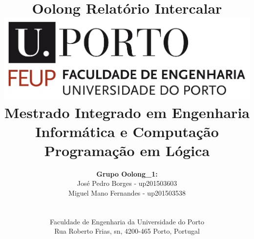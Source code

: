 \documentclass[a4paper]{article}
\begin{document}
\setlength{\textwidth}{16cm}
\setlength{\textheight}{22cm}

\title{\Huge\textbf{Oolong}\linebreak\linebreak\linebreak
\Large\textbf{Relatório Intercalar}\linebreak\linebreak
\linebreak\linebreak
\includegraphics[scale=0.1]{feup-logo.png}\linebreak\linebreak
\linebreak\linebreak
\Large{Mestrado Integrado em Engenharia Informática e Computação} \linebreak\linebreak
\Large{Programação em Lógica}\linebreak
}

\author{\textbf{Grupo Oolong\_1:}\\
José Pedro Borges - up201503603 \\
Miguel Mano Fernandes - up201503538 \\
\linebreak\linebreak \\
 \\ Faculdade de Engenharia da Universidade do Porto \\ Rua Roberto Frias, s\/n, 4200-465 Porto, Portugal \linebreak\linebreak\linebreak
\linebreak\linebreak\vspace{1cm}}

\maketitle
\thispagestyle{empty}
\end{document}
